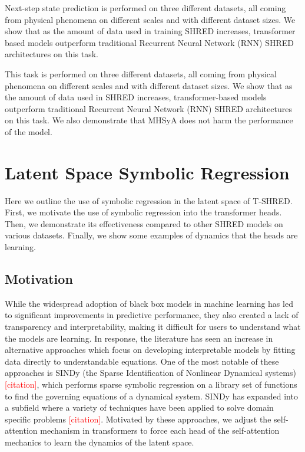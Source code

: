 \documentclass[11pt, a4paper]{article}
\begin{document}
Next-step state prediction is performed on three different datasets, all coming from physical phenomena on different scales and with different dataset sizes. We show that as the amount of data used in training SHRED increases, transformer based models outperform traditional Recurrent Neural Network (RNN) SHRED architectures on this task.

This task is performed on three different datasets, all coming from physical phenomena on different scales and with different dataset sizes. We show that as the amount of data used in SHRED increases, transformer-based models outperform traditional Recurrent Neural Network (RNN) SHRED architectures on this task. We also demonstrate that MHSyA does not harm the performance of the model.

\section{Latent Space Symbolic Regression}

Here we outline the use of symbolic regression in the latent space of T-SHRED. First, we motivate the use of symbolic regression into the transformer heads. Then, we demonstrate its effectiveness compared to other SHRED models on various datasets. Finally, we show some examples of dynamics that the heads are learning.

\subsection{Motivation}

While the widespread adoption of black box models in machine learning has led to significant improvements in predictive performance, they also created a lack of transparency and interpretability, making it
difficult for users to understand what the models are learning. In response, the literature has seen an increase in alternative approaches which focus on developing interpretable models by fitting data directly to understandable equations. One of the most notable of these approaches is SINDy (the Sparse Identification of Nonlinear Dynamical systems) \textcolor{red}{[citation]}, which performs sparse symbolic regression on a library set of functions to find the governing equations of a dynamical system. SINDy has expanded into a subfield where a variety of techniques have been applied to solve domain specific problems \textcolor{red}{[citation]}. Motivated by these approaches, we adjust the self-attention mechanism in transformers to force each head of the self-attention mechanics to learn the dynamics of the latent space. 
\end{document}
